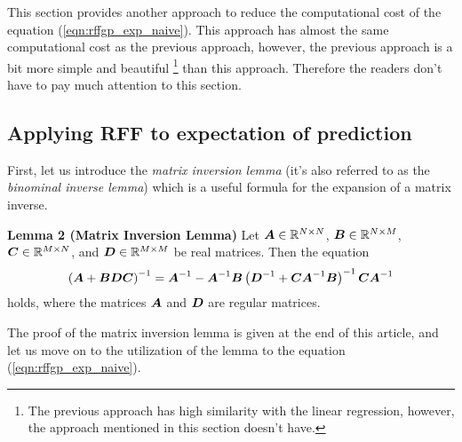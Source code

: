 \documentclass[twocolumn,a4paper,10pt]{article}
\begin{document}
This section provides another approach to reduce the computational cost of the equation (\ref{eqn:rffgp_exp_naive}).
This approach has almost the same computational cost as the previous approach,
however, the previous approach is a bit more simple and beautiful
\footnote{The previous approach has high similarity with the linear regression, 
however, the approach mentioned in this section doesn't have.}
than this approach. Therefore the readers don't have to pay much attention to this section.

\subsection{Applying RFF to expectation of prediction}

First, let us introduce the \textit{matrix inversion lemma} (it's also referred to as the
\textit{binominal inverse lemma}) which is a useful formula for the expansion of a matrix inverse.  

\vspace*{8pt}
\begin{thmbox}[M]{\bfseries{Lemma 2 (Matrix Inversion Lemma)}}
    Let
    $\boldsymbol{A} \in \mathbb{R}^{N \times N}$,
    $\boldsymbol{B} \in \mathbb{R}^{N \times M}$,
    $\boldsymbol{C} \in \mathbb{R}^{M \times N}$,
    and
    $\boldsymbol{D} \in \mathbb{R}^{M \times M}$
    be real matrices. Then the equation
    \begin{equation}
        \left( \boldsymbol{A} + \boldsymbol{BDC} \right)^{-1} = \boldsymbol{A}^{-1} - \boldsymbol{A}^{-1} \boldsymbol{B}
        \left( \boldsymbol{D}^{-1} + \boldsymbol{CA}^{-1} \boldsymbol{B} \right)^{-1} \boldsymbol{CA}^{-1}
        \label{eqn:matrix_inversion_lemma}
    \end{equation}
    holds, where the matrices $\boldsymbol{A}$ and $\boldsymbol{D}$ are regular matrices.
\end{thmbox}
\vspace*{4pt}

The proof of the matrix inversion lemma is given at the end of this article,
and let us move on to the utilization of the lemma to the equation (\ref{eqn:rffgp_exp_naive}).
\end{document}
